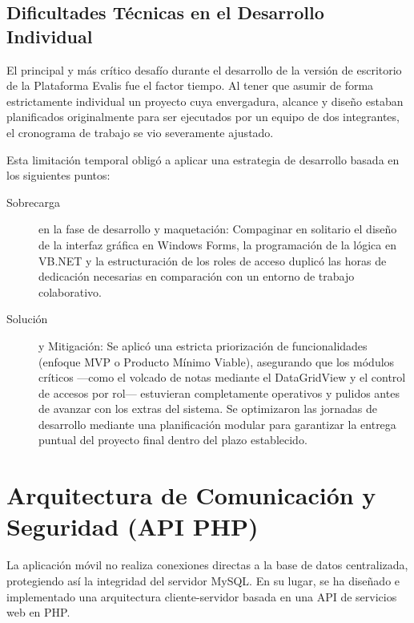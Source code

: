 \documentclass[spanish]{report}
\begin{document}
\section{Dificultades Técnicas en el Desarrollo Individual}

El principal y más crítico desafío durante el desarrollo de la versión
de escritorio de la Plataforma Evalis fue el factor tiempo. Al tener
que asumir de forma estrictamente individual un proyecto cuya envergadura,
alcance y diseño estaban planificados originalmente para ser ejecutados
por un equipo de dos integrantes, el cronograma de trabajo se vio
severamente ajustado.

Esta limitación temporal obligó a aplicar una estrategia de desarrollo
basada en los siguientes puntos:
\begin{description}
\item [{Sobrecarga}] en la fase de desarrollo y maquetación: Compaginar
en solitario el diseño de la interfaz gráfica en Windows Forms, la
programación de la lógica en VB.NET y la estructuración de los roles
de acceso duplicó las horas de dedicación necesarias en comparación
con un entorno de trabajo colaborativo.
\item [{Solución}] y Mitigación: Se aplicó una estricta priorización de
funcionalidades (enfoque MVP o Producto Mínimo Viable), asegurando
que los módulos críticos ---como el volcado de notas mediante el
DataGridView y el control de accesos por rol--- estuvieran completamente
operativos y pulidos antes de avanzar con los extras del sistema.
Se optimizaron las jornadas de desarrollo mediante una planificación
modular para garantizar la entrega puntual del proyecto final dentro
del plazo establecido.
\end{description}

\chapter{Arquitectura de Comunicación y Seguridad (API PHP)}

La aplicación móvil no realiza conexiones directas a la base de datos
centralizada, protegiendo así la integridad del servidor MySQL. En
su lugar, se ha diseñado e implementado una arquitectura cliente-servidor
basada en una API de servicios web en PHP.
\end{document}
